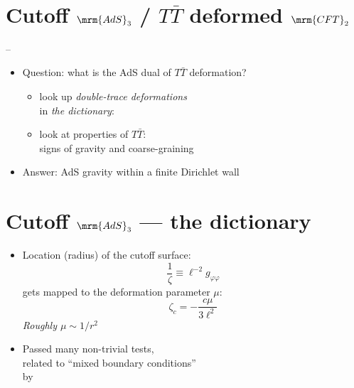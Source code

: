 \documentclass[11pt]{article}
\renewenvironment{frame}[1]%
	{\section*{#1}}%
	{}
\newcommand{\TTbar}{\texorpdfstring{\ensuremath{T\bar{T}}}{TTbar}\xspace}
\begin{document}
\begin{multicols}{3}
{\begin{center}
	\vspace{-.5\baselineskip}
	\ \scriptsize\textcite{AldegundePWSep22}
\end{center}
}

\begin{frame}{Cutoff $\mrm{AdS}_3$ / \TTbar deformed $\mrm{CFT}_2$}{%
	\textcite{McGough:2016lol} --
}

\figCutoffAds


\begin{itemize}
\item Question: what is the AdS dual of \TTbar deformation?

\begin{itemize}
\item look up \textit{double-trace deformations}\\
in \textit{the dictionary}:\\
\textcite{Heemskerk:2010hk}


\item look at properties of \TTbar:\\
signs of gravity and coarse-graining\\
\textcite{Dubovsky:2012wk,Dubovsky:2013ira}
\end{itemize}


\item Answer: AdS gravity within a finite Dirichlet wall

\end{itemize}

\end{frame}


\begin{frame}{Cutoff $\mrm{AdS}_3$ --- the dictionary}{}

	\begin{itemize}
	\item Location (radius) of the cutoff surface:
	\begin{equation}
		\frac{1}{\zeta} \equiv \ell^{-2} g_{\varphi\varphi} \label{cutoff}
	\end{equation}
	gets mapped to the deformation parameter $\mu$:
	\begin{equation}
		\zeta_c = - \frac{c \mu}{3\ell^2}
		\label{dictionary}
	\end{equation}
	\textit{Roughly $\mu \sim 1/r^2$}
	
	\item Passed many non-trivial tests,\\
	related to ``mixed boundary conditions''\\
	by \textcite{Guica:2019nzm}
	

\end{itemize}
\end{frame}
\end{multicols}
\end{document}

